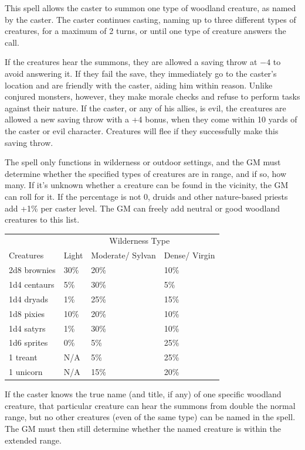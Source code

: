 \begin{multicols}{2}
This spell allows the caster to summon one type of woodland creature, as named by the caster.  The caster continues casting, naming up to three different types of creatures, for a maximum of 2 turns, or until one type of creature answers the call.
 
If the creatures hear the summons, they are allowed a saving throw at $-4$ to avoid answering it.  If they fail the save, they immediately go to the caster's location and are friendly with the caster, aiding him within reason.  Unlike conjured monsters, however, they make morale checks and refuse to perform tasks against their nature.  If the caster, or any of his allies, is evil, the creatures are allowed a new saving throw with a +4 bonus, when they come within 10 yards of the caster or evil character.  Creatures will flee if they successfully make this saving throw.  

The spell only functions in wilderness or outdoor settings, and the GM must determine whether the specified types of creatures are in range, and if so, how many.  If it's unknown whether a creature can be found in the vicinity, the GM can roll for it.  If the percentage is not 0, druids and other nature-based priests add +1\% per caster level.  The GM can freely add neutral or good woodland creatures to this list.


\noindent
\begin{tabular}{|m{}|m{}|m{}|m{}|}
\hline
 & \multicolumn{3}{c|}{Wilderness Type} \\
Creatures	& Light	& Moderate/ Sylvan	& Dense/ Virgin \\
\hline\hline
\rowcolor[gray]{.9}2d8 brownies	& 30\%	& 20\%	& 10\% \\
1d4 centaurs	& 5\%	& 30\%	& 5\% \\
\rowcolor[gray]{.9}1d4 dryads	& 1\%	& 25\%	& 15\% \\
1d8 pixies	& 10\%	& 20\%	& 10\% \\
\rowcolor[gray]{.9}1d4 satyrs	& 1\%	& 30\%	& 10\% \\
1d6 sprites	& 0\%	& 5\%	& 25\% \\
\rowcolor[gray]{.9}1 treant	& N/A	& 5\%	& 25\% \\
1 unicorn	& N/A	& 15\%	& 20\% \\
\hline
\end{tabular}

If the caster knows the true name (and title, if any) of one specific woodland creature, that particular creature can hear the summons from double the normal range, but no other creatures (even of the same type) can be named in the spell.  The GM must then still determine whether the named creature is within the extended range.


\end{multicols}
